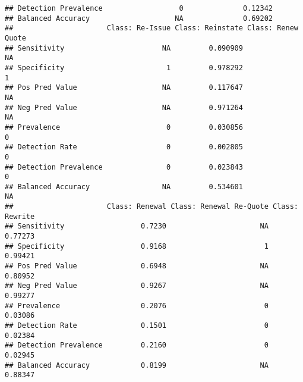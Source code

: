 \documentclass[]{article}
\begin{document}
\begin{verbatim}
## Detection Prevalence                  0              0.12342
## Balanced Accuracy                    NA              0.69202
##                      Class: Re-Issue Class: Reinstate Class: Renew Quote
## Sensitivity                       NA         0.090909                 NA
## Specificity                        1         0.978292                  1
## Pos Pred Value                    NA         0.117647                 NA
## Neg Pred Value                    NA         0.971264                 NA
## Prevalence                         0         0.030856                  0
## Detection Rate                     0         0.002805                  0
## Detection Prevalence               0         0.023843                  0
## Balanced Accuracy                 NA         0.534601                 NA
##                      Class: Renewal Class: Renewal Re-Quote Class: Rewrite
## Sensitivity                  0.7230                      NA        0.77273
## Specificity                  0.9168                       1        0.99421
## Pos Pred Value               0.6948                      NA        0.80952
## Neg Pred Value               0.9267                      NA        0.99277
## Prevalence                   0.2076                       0        0.03086
## Detection Rate               0.1501                       0        0.02384
## Detection Prevalence         0.2160                       0        0.02945
## Balanced Accuracy            0.8199                      NA        0.88347
\end{verbatim}
\end{document}
